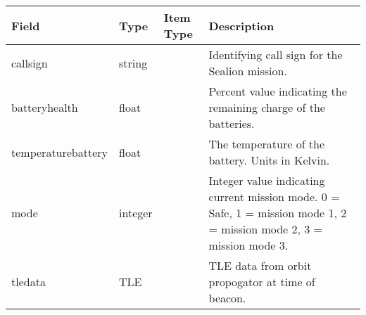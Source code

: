 
\begin{tabular}{ | m{3cm} | m{1cm}| m{1cm} | m{4cm} | } 
  \hline
  \textbf{Field} & Type & Item Type & Description \\
  \hline
  callsign & string &  & Identifying call sign for the Sealion mission. \\
  \hline
  batteryhealth & float &  & Percent value indicating the remaining charge of the batteries. \\
  \hline
  temperaturebattery & float &  & The temperature of the battery. Units in Kelvin. \\
  \hline
  mode & integer &  & Integer value indicating current mission mode. 0 = Safe, 1 = mission mode 1, 2 = mission mode 2, 3 = mission mode 3. \\
  \hline
  tledata & TLE &  & TLE data from orbit propogator at time of beacon. \\
  \hline
  
\end{tabular}
